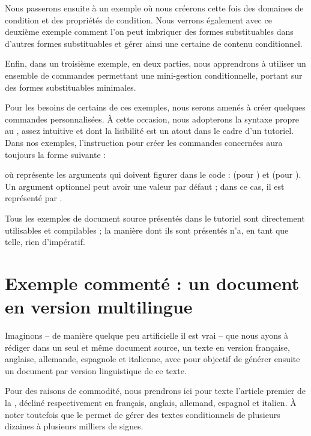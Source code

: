 \documentclass{article}
\begin{document}
Nous passerons ensuite à un exemple où nous créerons cette fois des domaines de condition et des propriétés de condition. Nous verrons également avec ce deuxième exemple comment l'on peut imbriquer des formes substituables dans d'autres formes substituables et gérer ainsi une certaine  de contenu conditionnel.

Enfin, dans un troisième exemple, en deux parties, nous apprendrons à utiliser un ensemble de commandes permettant une mini-gestion conditionnelle, portant sur des formes substituables minimales.

 Pour les besoins de certains de ces exemples, nous serons amenés à créer quelques commandes personnalisées. À cette occasion, nous adopterons la syntaxe propre au , assez intuitive et dont la lisibilité est un atout dans le cadre d'un tutoriel. Dans nos exemples, l'instruction pour créer les commandes concernées aura toujours la forme suivante :


\resumepar où  représente les arguments qui doivent figurer dans le code :  (pour ) et  (pour ). Un argument optionnel peut avoir une valeur par défaut ; dans ce cas, il est représenté par .

Tous les exemples de document source présentés dans le tutoriel sont directement utilisables et compilables ; la manière dont ils sont présentés n'a, en tant que telle, rien d'impératif.

\section{Exemple commenté  : un document en version multilingue}
Imaginons -- de manière quelque peu artificielle il est vrai -- que nous ayons à rédiger dans un seul et même document source, un texte en version française, anglaise, allemande, espagnole et italienne, avec pour objectif de générer ensuite un document par version linguistique de ce texte.

Pour des raisons de commodité, nous prendrons ici pour texte l'article premier de la , décliné respectivement en français, anglais, allemand, espagnol et italien. À noter toutefois que le  permet de gérer des textes conditionnels de plusieurs dizaines à plusieurs milliers de signes.
\end{document}
